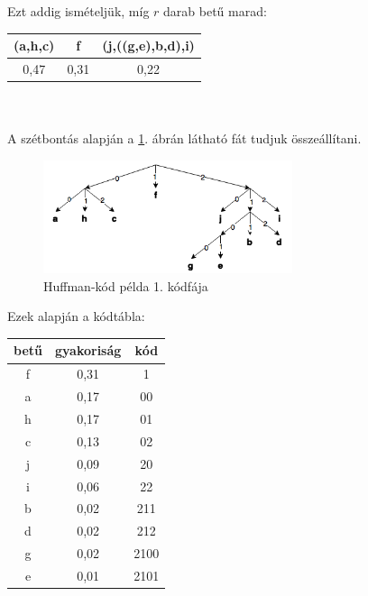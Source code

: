 \documentclass[12pt,margin=0px]{article}
\begin{document}
    \noindent Ezt addig ismételjük, míg $r$ darab betű marad:\\

    \noindent \begin{tabular}{|c|c|c|}
        \hline (a,h,c) & f & (j,((g,e),b,d),i) \\
        \hline 0,47 & 0,31 & 0,22 \\
        \hline
    \end{tabular}\\\\

    \noindent A szétbontás alapján a \ref{fig:huffmann_split}. ábrán látható fát tudjuk összeállítani.\\

    \begin{figure}[H]
        \centering
        \includegraphics[width=0.65\textwidth]{img/huffmann_split.png}
        \caption{Huffman-kód példa 1. kódfája}
        \label{fig:huffmann_split}
    \end{figure}

    \noindent Ezek alapján a kódtábla:\\

    \noindent \begin{tabular}{|c|c|c|}
        \hline betű & gyakoriság & kód \\
        \hline f & 0,31 & 1 \\
        \hline a & 0,17 & 00\\
        \hline h & 0,17 & 01\\
        \hline c & 0,13 & 02\\
        \hline j & 0,09 & 20\\
        \hline i & 0,06 & 22\\
        \hline b & 0,02 & 211\\
        \hline d & 0,02 & 212\\
        \hline g & 0,02 & 2100\\
        \hline e & 0,01 & 2101\\
        \hline
    \end{tabular}
			
\end{document}

